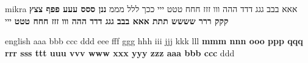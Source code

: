\documentclass{article}
\begin{document}
\begin{mekor}
\begin{mekorlang}{mikra}
\pasuk[1]  אאא בבב גגג דדד ההה ווו זזז חחח טטט ייי ככך ללל מממ \textbf{ננן ססס עעע פפף צצץ קקק ררר שששש תתת אאא בבב גגג דדד ההה ווו זזז חחח טטט} ייי
\end{mekorlang}
\begin{mekorlang}{english}
\pasuk[1]  aaa bbb ccc ddd eee fff ggg hhh iii jjj kkk lll \textbf{mmm nnn ooo ppp qqq rrr sss ttt uuu vvv www xxx yyy zzz aaa bbb ccc} ddd
\end{mekorlang}
\end{mekor}
\end{document}
